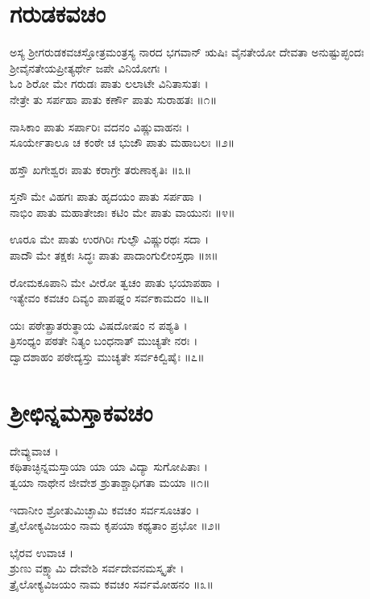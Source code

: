 \section{ಗರುಡಕವಚಂ}

ಅಸ್ಯ ಶ್ರೀಗರುಡಕವಚಸ್ತೋತ್ರಮಂತ್ರಸ್ಯ ನಾರದ ಭಗವಾನ್ ಋಷಿಃ ವೈನತೇಯೋ ದೇವತಾ ಅನುಷ್ಟುಪ್ಛಂದಃ ಶ್ರೀವೈನತೇಯಪ್ರೀತ್ಯರ್ಥೇ ಜಪೇ ವಿನಿಯೋಗಃ ।\\

ಓಂ ಶಿರೋ ಮೇ ಗರುಡಃ ಪಾತು ಲಲಾಟೇ ವಿನಿತಾಸುತಃ ।\\
ನೇತ್ರೇ ತು ಸರ್ಪಹಾ ಪಾತು ಕರ್ಣೌ ಪಾತು ಸುರಾಹತಃ ॥೧॥

ನಾಸಿಕಾಂ ಪಾತು ಸರ್ಪಾರಿಃ ವದನಂ ವಿಷ್ಣುವಾಹನಃ ।\\
ಸೂರ್ಯೇತಾಲೂ ಚ ಕಂಠೇ ಚ ಭುಜೌ ಪಾತು ಮಹಾಬಲಃ ॥೨॥

ಹಸ್ತೌ ಖಗೇಶ್ವರಃ ಪಾತು ಕರಾಗ್ರೇ ತರುಣಾಕೃತಿಃ ॥೩॥

ಸ್ತನೌ ಮೇ ವಿಹಗಃ ಪಾತು ಹೃದಯಂ ಪಾತು ಸರ್ಪಹಾ ।\\
ನಾಭಿಂ ಪಾತು ಮಹಾತೇಜಾಃ ಕಟಿಂ ಮೇ ಪಾತು ವಾಯುನಃ ॥೪॥

ಊರೂ ಮೇ ಪಾತು ಉರಗಿರಿಃ ಗುಲ್ಫೌ ವಿಷ್ಣುರಥಃ ಸದಾ ।\\
ಪಾದೌ ಮೇ ತಕ್ಷಕಃ ಸಿದ್ಧಃ ಪಾತು ಪಾದಾಂಗುಲೀಂಸ್ತಥಾ ॥೫॥

ರೋಮಕೂಪಾನಿ ಮೇ ವೀರೋ ತ್ವಚಂ ಪಾತು ಭಯಾಪಹಾ ।\\
ಇತ್ಯೇವಂ ಕವಚಂ ದಿವ್ಯಂ ಪಾಪಘ್ನಂ ಸರ್ವಕಾಮದಂ ॥೬॥

ಯಃ ಪಠೇತ್ಪ್ರಾತರುತ್ಥಾಯ ವಿಷದೋಷಂ ನ ಪಶ್ಯತಿ ।\\
ತ್ರಿಸಂಧ್ಯಂ ಪಠತೇ ನಿತ್ಯಂ ಬಂಧನಾತ್ ಮುಚ್ಯತೇ ನರಃ ।\\
ದ್ವಾದಶಾಹಂ ಪಠೇದ್ಯಸ್ತು ಮುಚ್ಯತೇ ಸರ್ವಕಿಲ್ವಿಷೈಃ ॥೭॥


\section{ಶ್ರೀಛಿನ್ನಮಸ್ತಾಕವಚಂ}
ದೇವ್ಯುವಾಚ ।\\
ಕಥಿತಾಚ್ಛಿನ್ನಮಸ್ತಾಯಾ ಯಾ ಯಾ ವಿದ್ಯಾ ಸುಗೋಪಿತಾಃ ।\\
ತ್ವಯಾ ನಾಥೇನ ಜೀವೇಶ ಶ್ರುತಾಶ್ಚಾಧಿಗತಾ ಮಯಾ ॥೧॥

ಇದಾನೀಂ ಶ್ರೋತುಮಿಚ್ಛಾಮಿ ಕವಚಂ ಸರ್ವಸೂಚಿತಂ ।\\
ತ್ರೈಲೋಕ್ಯವಿಜಯಂ ನಾಮ ಕೃಪಯಾ ಕಥ್ಯತಾಂ ಪ್ರಭೋ ॥೨॥

ಭೈರವ ಉವಾಚ ।\\
ಶ್ರುಣು ವಕ್ಷ್ಯಾಮಿ ದೇವೇಶಿ ಸರ್ವದೇವನಮಸ್ಕೃತೇ ।\\
ತ್ರೈಲೋಕ್ಯವಿಜಯಂ ನಾಮ ಕವಚಂ ಸರ್ವಮೋಹನಂ ॥೩॥

